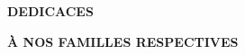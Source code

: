 \cleardoublepage
\thispagestyle{empty}

\begin{center}
    {\sffamily\Huge\bfseries\color{argosblue}
        DEDICACES
    }
\end{center}


\vspace*{\fill}

\begin{center}
    {\sffamily\Huge\bfseries\color{argosblue}
    À NOS FAMILLES RESPECTIVES
    }
\end{center}

\vspace*{\fill}